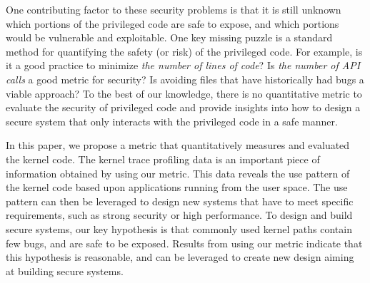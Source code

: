 One contributing factor to these security problems 
is that it is still unknown which portions of the privileged code are
safe to expose, and which portions would be vulnerable and exploitable. 
One key missing puzzle is a standard method for quantifying the safety (or 
risk) of the privileged code. 
For example, is it a good practice to minimize \textit{the number of lines of code}?
Is \textit{the number of API calls} a good metric for security?   
Is avoiding files that have historically had bugs a viable approach?
To the best of our knowledge, there is no quantitative metric  to evaluate the 
security of privileged code  and provide 
insights into how to design a secure system that only interacts with the privileged code in a safe manner.

In this paper, we propose a metric that quantitatively measures and evaluated 
the 
kernel code. The kernel trace profiling data is an important piece of information 
obtained by using our metric. 
This data reveals the use pattern of the kernel code 
based upon applications running from the user space. The use pattern can then be
leveraged to design new systems that have to meet specific requirements, 
such as strong security or high performance. 
To design and build secure systems, 
our key hypothesis is that commonly used kernel paths contain few bugs, and are 
safe to be exposed. 
Results from using our metric indicate that this hypothesis is reasonable, and 
can be leveraged to create new design aiming at building secure systems. 

